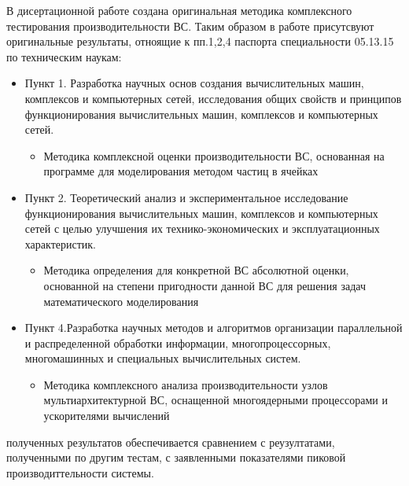 {}
В дисертационной работе создана оригинальная методика комплексного тестирования производительности ВС. Таким образом в работе присутсвуют оригинальные результаты, отноящие к пп.1,2,4 паспорта специальности 05.13.15 по техническим наукам:
\begin{itemize}
	\item Пункт 1. Разработка научных основ создания вычислительных машин, комплексов и компьютерных сетей, исследования общих свойств и принципов функционирования вычислительных машин, комплексов и компьютерных сетей.
	\begin{itemize}
		
		\item Методика комплексной оценки производительности ВС, основанная на программе для моделирования методом частиц в ячейках
	\end{itemize}
	
	\item Пункт 2. Теоретический анализ и экспериментальное исследование функционирования вычислительных машин, комплексов и компьютерных сетей с целью улучшения их технико-экономических и эксплуатационных характеристик.
	\begin{itemize}
		
		\item Методика определения для конкретной ВС абсолютной оценки, основанной на степени пригодности данной ВС для решения задач математического моделирования
	\end{itemize}
	
	\item Пункт 4.Разработка научных методов и алгоритмов организации параллельной и распределенной обработки информации, многопроцессорных, многомашинных и специальных вычислительных систем.
	\begin{itemize}	
		\item Методика комплексного анализа производительности узлов мультиархитектурной ВС, оснащенной многоядерными процессорами и ускорителями вычислений
	\end{itemize}
\end{itemize}


{\reliability}  полученных результатов обеспечивается сравнением с реузултатами, полученными по другим тестам, с заявленными показателями пиковой производиттельности системы.


{\probation}

